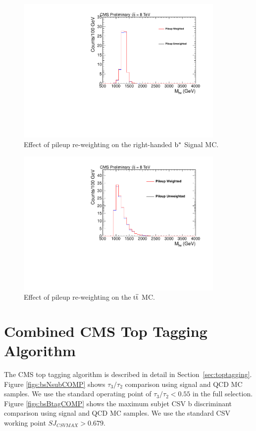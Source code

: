 \begin{figure}[htcb]
\centering
\includegraphics[width=0.9\textwidth]{AN-14-049/figs/Signal_M1300_PileupComp.pdf}
\caption{Effect of pileup re-weighting on the right-handed $\mathrm{b}^{*}$ Signal MC.}
\label{figs:bspileup3}
\end{figure}

\begin{figure}[htcb]
\centering
\includegraphics[width=0.9\textwidth]{AN-14-049/figs/TTbar_PileupComp.pdf}
\caption{Effect of pileup re-weighting on the $\mathrm{t\overline{t}}$ MC.}
\label{figs:bspileup3ttbar}
\end{figure}



\section{Combined CMS Top Tagging Algorithm}
\label{sec:bstoptagging}
\label{sec:bssubjetSF}
The CMS top tagging algorithm is described in detail in Section~\ref{sec:toptagging}.
Figure \ref{figs:bsNsubCOMP} shows $\tau_3/\tau_2$ comparison using signal and QCD MC samples.  We use the standard operating point of $\tau_3/\tau_2 < 0.55$ in the full selection.
Figure \ref{figs:bsBtagCOMP} shows the maximum subjet CSV b discriminant comparison using signal and QCD MC samples.  We use the standard CSV working point $SJ_{CSVMAX} > 0.679$.

